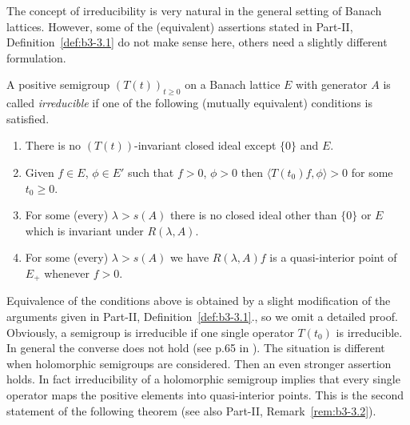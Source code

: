 The concept of irreducibility is very natural in the general setting of Banach lattices.
However, some of the (equivalent) assertions stated in Part-II, Definition~\ref{def:b3-3.1} do not make sense here, others need a slightly different formulation.
\begin{definition}\label{def:c3-3.1}
	
	A positive semigroup $(T(t))_{t\geq 0}$ on a Banach lattice $E$ with generator $A$ is called \emph{irreducible} if one of the following (mutually equivalent) conditions is satisfied.
	\begin{enumerate}[\upshape (a)]
	\item
	There is no $(T(t))$-invariant closed ideal except $\{0\}$ and $E$.
	
	\item 
	Given $f \in E$, $\phi \in E'$ such that $f > 0$, $\phi > 0$ then $\langle T(t_{0})f,\phi \rangle > 0$ for some $t_{0} \geq 0$.
	
    
	\item 
	For some (every) $\lambda > s(A)$ there is no closed ideal other than $\{0\}$ or $E$ which is invariant under $R(\lambda,A)$.
	
	\item 
	For some (every) $\lambda > s(A)$ we have $R(\lambda,A)f$ is a quasi-interior point of\/ $E_{+}$ whenever $f > 0$.
	\end{enumerate}
\end{definition}
Equivalence of the conditions above is obtained by a slight modification of the arguments given in Part-II, Definition~\ref{def:b3-3.1}.,
so we omit a detailed proof.
Obviously, a semigroup is irreducible if one single operator $T(t_{0})$ is irreducible.
In general the converse does not hold (see p.65 in \textcite{greiner:1982}).
The situation is different when holomorphic semigroups are considered.
Then an even stronger assertion holds. In fact irreducibility of a holomorphic semigroup implies that every single operator maps the positive elements into quasi-interior points.
This is the second statement of the following theorem (see also Part-II, Remark~\ref{rem:b3-3.2}).

